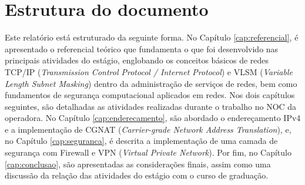 \section{Estrutura do documento}

    Este relatório está estruturado da seguinte forma. No Capítulo \ref{cap:referencial}, é apresentado o referencial teórico que fundamenta o que foi desenvolvido nas principais atividades do estágio, englobando os conceitos básicos de redes TCP/IP (\textit{Transmission Control Protocol / Internet Protocol}) e VLSM (\textit{Variable Length Subnet Masking}) dentro da administração de serviços de redes, bem como fundamentos de segurança computacional aplicados em redes. Nos dois capítulos seguintes, são detalhadas as atividades realizadas durante o trabalho no NOC da operadora. No Capítulo \ref{cap:enderecamento}, são abordado o endereçamento IPv4 e a implementação de CGNAT (\textit{Carrier-grade Network Address Translation}), e, no Capítulo \ref{cap:seguranca}, é descrita a implementação de uma camada de segurança com Firewall e VPN (\textit{Virtual Private Network}). Por fim, no Capítulo \ref{cap:conclusao}, são apresentadas as considerações finais, assim como uma discussão da relação das atividades do estágio com o curso de graduação.
    
